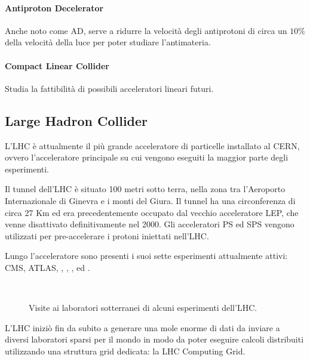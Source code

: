 		\paragraph{Antiproton Decelerator}Anche noto come \acs{AD}, serve a ridurre la velocità degli antiprotoni di circa un $10\%$ della velocità della luce per poter studiare l'antimateria.
		
		\paragraph{Compact Linear Collider}Studia la fattibilità di possibili acceleratori lineari futuri.
		
		\subsection{Large Hadron Collider} \label{subsec:C;a;LHC}
			
			L'\ac{LHC} è attualmente il più grande acceleratore di particelle installato al \ac{CERN}, ovvero l'acceleratore principale su cui vengono eseguiti la maggior parte degli esperimenti.
			
			Il tunnel dell'\ac{LHC} è situato 100 metri sotto terra, nella zona tra l'Aeroporto Internazionale di Ginevra e i monti del Giura. Il tunnel ha una circonferenza di circa 27 Km ed era precedentemente occupato dal vecchio acceleratore \ac{LEP}, che venne disattivato definitivamente nel 2000. Gli acceleratori \ac{PS} ed \ac{SPS} vengono utilizzati per pre-accelerare i protoni iniettati nell'\ac{LHC}.
			
			Lungo l'acceleratore sono presenti i suoi sette esperimenti attualmente attivi: \ac{CMS}, \ac{ATLAS}, , , ,  ed .
			
			\begin{figure}[h!]
				\begin{center}
					~
				\end{center}
				\caption[Visita all'LHC]{Visite ai laboratori sotterranei di alcuni esperimenti dell'LHC.}
				\label{fig:visita_lhc}
			\end{figure}
			
			L'\ac{LHC} iniziò fin da subito a generare una mole enorme di dati da inviare a diversi laboratori sparsi per il mondo in modo da poter eseguire calcoli distribuiti utilizzando una struttura grid dedicata: la LHC Computing Grid.
			
